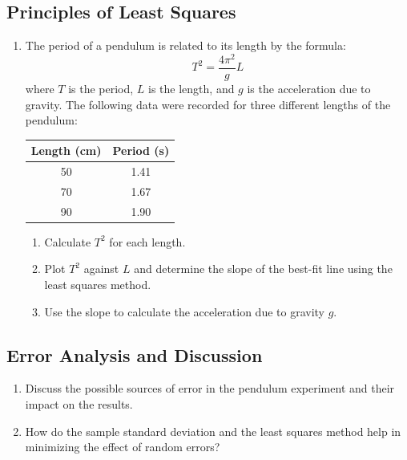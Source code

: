 \documentclass[12pt]{article}
\begin{document}
	\subsection*{Principles of Least Squares}
	\begin{enumerate}
		\item The period of a pendulum is related to its length by the formula:
		\[ T^2 = \frac{4\pi^2}{g} L \]
		where \( T \) is the period, \( L \) is the length, and \( g \) is the acceleration due to gravity.
		The following data were recorded for three different lengths of the pendulum:
		\begin{center}
			\begin{tabular}{|c|c|}
				\hline
				Length (cm) & Period (s) \\
				\hline
				50 & 1.41 \\
				70 & 1.67 \\
				90 & 1.90 \\
				\hline
			\end{tabular}
		\end{center}
		\begin{enumerate}
			\item Calculate \( T^2 \) for each length.
			\item Plot \( T^2 \) against \( L \) and determine the slope of the best-fit line using the least squares method.
			\item Use the slope to calculate the acceleration due to gravity \( g \).
		\end{enumerate}
	\end{enumerate}
	
	\subsection*{Error Analysis and Discussion}
	\begin{enumerate}
		\item Discuss the possible sources of error in the pendulum experiment and their impact on the results.
		\item How do the sample standard deviation and the least squares method help in minimizing the effect of random errors?
	\end{enumerate}
	
\end{document}
